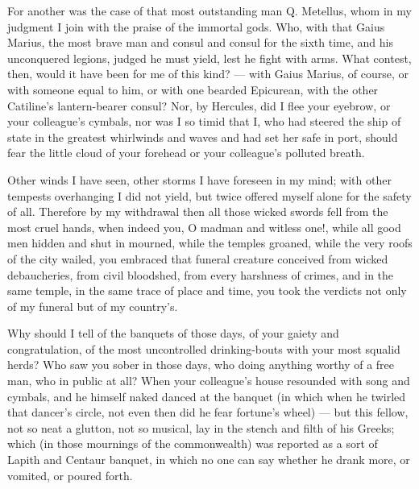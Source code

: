  For another was the case of that most outstanding man Q. Metellus, whom in my judgment I join with the praise of the immortal gods. Who, with that Gaius Marius, the most brave man and consul and consul for the sixth time, and his unconquered legions, judged he must yield, lest he fight with arms. What contest, then, would it have been for me of this kind? — with Gaius Marius, of course, or with someone equal to him, or with one bearded Epicurean, with the other Catiline's lantern-bearer consul? Nor, by Hercules, did I flee your eyebrow, or your colleague's cymbals, nor was I so timid that I, who had steered the ship of state in the greatest whirlwinds and waves and had set her safe in port, should fear the little cloud of your forehead or your colleague's polluted breath.

 Other winds I have seen, other storms I have foreseen in my mind; with other tempests overhanging I did not yield, but twice offered myself alone for the safety of all. Therefore by my withdrawal then all those wicked swords fell from the most cruel hands, when indeed you, O madman and witless one!, while all good men hidden and shut in mourned, while the temples groaned, while the very roofs of the city wailed, you embraced that funeral creature conceived from wicked debaucheries, from civil bloodshed, from every harshness of crimes, and in the same temple, in the same trace of place and time, you took the verdicts not only of my funeral but of my country's.

 Why should I tell of the banquets of those days, of your gaiety and congratulation, of the most uncontrolled drinking-bouts with your most squalid herds? Who saw you sober in those days, who doing anything worthy of a free man, who in public at all? When your colleague's house resounded with song and cymbals, and he himself naked danced at the banquet (in which when he twirled that dancer's circle, not even then did he fear fortune's wheel) — but this fellow, not so neat a glutton, not so musical, lay in the stench and filth of his Greeks; which (in those mournings of the commonwealth) was reported as a sort of Lapith and Centaur banquet, in which no one can say whether he drank more, or vomited, or poured forth.

